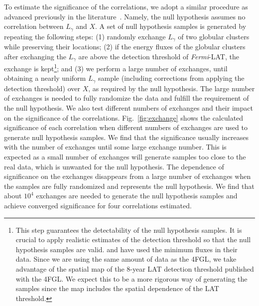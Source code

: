 \documentclass[doublespace,nopageskip]{VTthesis}
\begin{document}
To estimate the significance of the correlations, we adopt a similar procedure as advanced previously in the literature~\citep{2012ApJ...755..164A}. Namely, the null hypothesis assumes no correlation between $L_\gamma$ and $X$. A set of null hypothesis samples is generated by repeating the following steps: (1) randomly exchange $L_\gamma$ of two globular clusters while preserving their locations; (2) if the energy fluxes of the globular clusters after exchanging the $L_\gamma$ are above the detection threshold of \textit{Fermi}-LAT, the exchange is kept\footnote{This step guarantees the detectability of the null hypothesis samples. It is crucial to apply realistic estimates of the detection threshold so that the null hypothesis samples are valid. \citet{2012ApJ...755..164A} and \citet{2020ApJ...894...88A} have used the minimum fluxes in their data. Since we are using the same amount of data as the 4FGL, we take advantage of the spatial map of the 8-year LAT detection threshold published with the 4FGL. We expect this to be a more rigorous way of generating the samples since the map includes the spatial dependence of the LAT threshold.}; and (3) we perform a large number of exchanges, until obtaining a nearly uniform $L_\gamma$ sample (including corrections from applying the detection threshold) over $X$, as required by the null hypothesis. 
The large number of exchanges is needed to fully randomize the data and fulfill the requirement of the null hypothesis. We also test different numbers of exchanges and their impact on the significance of the correlations. Fig.~\ref{fig:exchange} shows the calculated significance of each correlation when different numbers of exchanges are used to generate null hypothesis samples. We find that the significance usually increases with the number of exchanges until some large exchange number. This is expected as a small number of exchanges will generate samples too close to the real data, which is unwanted for the null hypothesis. The dependence of significance on the exchanges disappears from a large number of exchanges when the samples are fully randomized and represents the null hypothesis. We find that about $10^4$ exchanges are needed to generate the null hypothesis samples and achieve converged significance for four correlations estimated.
\end{document}
